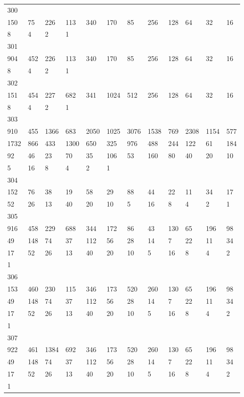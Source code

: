 \begin{longtable}{llllllllllll}
300&&&&&&&&&&&\\
150& 75& 226& 113& 340& 170& 85& 256& 128& 64& 32& 16\\
8& 4& 2& 1& \\

301&&&&&&&&&&&\\
904& 452& 226& 113& 340& 170& 85& 256& 128& 64& 32& 16\\
8& 4& 2& 1& \\

302&&&&&&&&&&&\\
151& 454& 227& 682& 341& 1024& 512& 256& 128& 64& 32& 16\\
8& 4& 2& 1& \\

303&&&&&&&&&&&\\
910& 455& 1366& 683& 2050& 1025& 3076& 1538& 769& 2308& 1154& 577\\
1732& 866& 433& 1300& 650& 325& 976& 488& 244& 122& 61& 184\\
92& 46& 23& 70& 35& 106& 53& 160& 80& 40& 20& 10\\
5& 16& 8& 4& 2& 1& \\

304&&&&&&&&&&&\\
152& 76& 38& 19& 58& 29& 88& 44& 22& 11& 34& 17\\
52& 26& 13& 40& 20& 10& 5& 16& 8& 4& 2& 1\\

305&&&&&&&&&&&\\
916& 458& 229& 688& 344& 172& 86& 43& 130& 65& 196& 98\\
49& 148& 74& 37& 112& 56& 28& 14& 7& 22& 11& 34\\
17& 52& 26& 13& 40& 20& 10& 5& 16& 8& 4& 2\\
1& \\

306&&&&&&&&&&&\\
153& 460& 230& 115& 346& 173& 520& 260& 130& 65& 196& 98\\
49& 148& 74& 37& 112& 56& 28& 14& 7& 22& 11& 34\\
17& 52& 26& 13& 40& 20& 10& 5& 16& 8& 4& 2\\
1& \\

307&&&&&&&&&&&\\
922& 461& 1384& 692& 346& 173& 520& 260& 130& 65& 196& 98\\
49& 148& 74& 37& 112& 56& 28& 14& 7& 22& 11& 34\\
17& 52& 26& 13& 40& 20& 10& 5& 16& 8& 4& 2\\
1& \\


\end{longtable}
